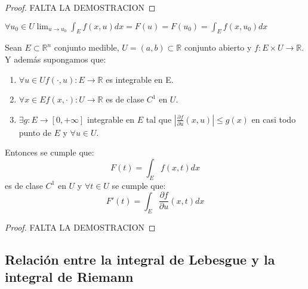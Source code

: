 \begin{proof}
    FALTA LA DEMOSTRACION
\end{proof}
\begin{observación}
    $\forall u_0 \in U \lim_{u \to u_0} \int_{E}f(x, u)dx = F(u) = F(u_0) = \int_{E}f(x, u_0)dx$
\end{observación}
\begin{teorema}
    Sean $E \subset \mathbb{R}^n$ conjunto medible, $U = (a, b) \subset \mathbb{R}$ conjunto abierto y $f: E \times U \to \mathbb{R}$. Y además supongamos que: 
    \begin{enumerate}
        \item $\forall u \in U f(\cdot, u): E \to \mathbb{R}$ es integrable en E.
        \item $\forall x \in E f(x, \cdot): U \to \mathbb{R}$ es de clase $C^1$ en $U$.
        \item $\exists g: E \to [0, +\infty]$ integrable en $E$ tal que $|\frac{\partial f}{\partial u}(x, u)| \leq g(x)$ en casi todo punto de $E$ y $\forall u \in U$.
    \end{enumerate}
    Entonces se cumple que: 
    $$ F(t) = \int_{E}f(x,t)dx $$ es de clase $C^1$ en $U$ y $\forall t \in U$ se cumple que: $$ F'(t) = \int_{E}\frac{\partial f}{\partial u}(x, t)dx $$
\end{teorema}
\begin{proof}
    FALTA LA DEMOSTRACION
\end{proof}


\subsection{Relación entre la integral de Lebesgue y la integral de Riemann}

